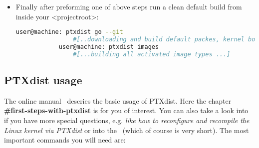 \begin{itemize}
    \item Finally after preforming one of above steps run a clean default build
        from inside your <projectroot>:
        \begin{lstlisting}[language=bash,gobble=12,caption={Initial PTXdist
        build}]
            user@machine: ptxdist go --git
                #[..downloading and build default packes, kernel bootloader...]
            user@machine: ptxdist images
                #[...building all activated image types ...]
        \end{lstlisting}
\end{itemize}



\subsection{PTXdist usage}%

The online manual~\cite[PTXdist user manual]{ptxdist_manual} descries the basic
usage of PTXdist. Here the chapter \textbf{\#first-steps-with-ptxdist} is for
you of interest. You can also take a look into~\cite{ptxdist_developer} if you
have more special questions, e.g. \textit{like how to reconfigure and recompile
the Linux kernel via PTXdist} or into the~\cite[PTXdist FAQ list]{ptxdist_faq}
(which of course is very short). The most important commands you will need are:

